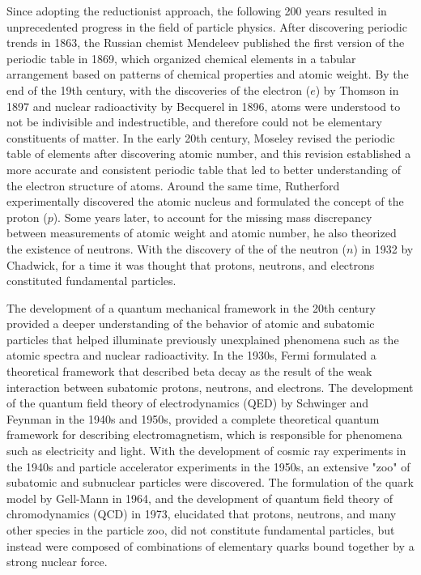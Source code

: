 Since adopting the reductionist approach, the following 200 years resulted in unprecedented progress in the field of particle physics.
After discovering periodic trends in 1863, the Russian chemist Mendeleev published the first version of the periodic table in 1869, which organized chemical elements in a tabular arrangement based on patterns of chemical properties and atomic weight.
By the end of the 19th century, with the discoveries of the electron ($e$) by Thomson in 1897 and nuclear radioactivity by Becquerel in 1896, atoms were understood to not be indivisible and indestructible, and therefore could not be elementary constituents of matter.
In the early 20th century, Moseley revised the periodic table of elements after discovering atomic number, and this revision established a more accurate and consistent periodic table that led to better understanding of the electron structure of atoms.
Around the same time, Rutherford experimentally discovered the atomic nucleus and formulated the concept of the proton ($p$).
Some years later, to account for the missing mass discrepancy between measurements of atomic weight and atomic number, he also theorized the existence of neutrons.
With the discovery of the of the neutron ($n$) in 1932 by Chadwick, for a time it was thought that protons, neutrons, and electrons constituted fundamental particles.

The development of a quantum mechanical framework in the 20th century provided a deeper understanding of the behavior of atomic and subatomic particles that helped illuminate previously unexplained phenomena such as the atomic spectra and nuclear radioactivity.
In the 1930s, Fermi formulated a theoretical framework that described beta decay as the result of the weak interaction between subatomic protons, neutrons, and electrons.
The development of the quantum field theory of electrodynamics (QED) by Schwinger and Feynman in the 1940s and 1950s, provided a complete theoretical quantum framework for describing electromagnetism, which is responsible for phenomena such as electricity and light.
With the development of cosmic ray experiments in the 1940s and particle accelerator experiments in the 1950s, an extensive "zoo" of subatomic and subnuclear particles were discovered.
The formulation of the quark model by Gell-Mann in 1964, and the development of quantum field theory of chromodynamics (QCD) in 1973, elucidated that protons, neutrons, and many other species in the particle zoo, did not constitute fundamental particles, but instead were composed of combinations of elementary quarks bound together by a strong nuclear force.

